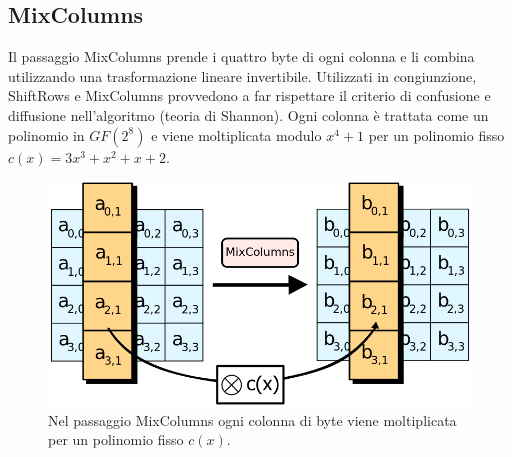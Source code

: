 \subsection{MixColumns}
Il passaggio MixColumns prende i quattro byte di ogni colonna e li combina utilizzando una trasformazione lineare invertibile. Utilizzati in congiunzione, ShiftRows e MixColumns provvedono a far rispettare il criterio di confusione e diffusione nell'algoritmo (teoria di Shannon). Ogni colonna è trattata come un polinomio in \(GF(2^8)\) e viene moltiplicata modulo \(x^4+1\) per un polinomio fisso \(c(x)=3x^3+x^2+x+2\).



\begin{figure}[H]
\centering
\includegraphics[scale=0.3]{img/mixColumns}
\caption{Nel passaggio MixColumns ogni colonna di byte viene moltiplicata per un polinomio fisso \(c(x)\).}
\end{figure}
